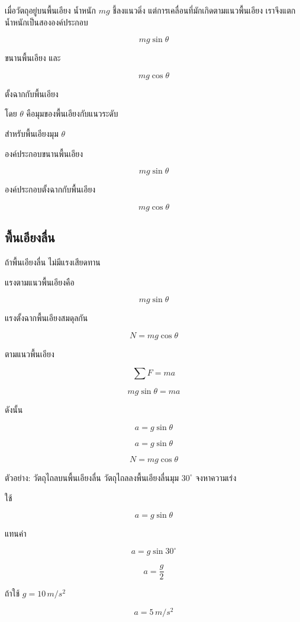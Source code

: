 เมื่อวัตถุอยู่บนพื้นเอียง น้ำหนัก $mg$ ชี้ลงแนวดิ่ง แต่การเคลื่อนที่มักเกิดตามแนวพื้นเอียง เราจึงแตกน้ำหนักเป็นสององค์ประกอบ

\[
mg\sin\theta
\]

ขนานพื้นเอียง และ

\[
mg\cos\theta
\]

ตั้งฉากกับพื้นเอียง

โดย $\theta$ คือมุมของพื้นเอียงกับแนวระดับ

\begin{tcolorbox}[title=องค์ประกอบของน้ำหนักบนพื้นเอียง]
สำหรับพื้นเอียงมุม $\theta$

องค์ประกอบขนานพื้นเอียง

\[
mg\sin\theta
\]

องค์ประกอบตั้งฉากกับพื้นเอียง

\[
mg\cos\theta
\]
\end{tcolorbox}

\subsection{พื้นเอียงลื่น}

ถ้าพื้นเอียงลื่น ไม่มีแรงเสียดทาน

แรงตามแนวพื้นเอียงคือ

\[
mg\sin\theta
\]

แรงตั้งฉากพื้นเอียงสมดุลกัน

\[
N=mg\cos\theta
\]

ตามแนวพื้นเอียง

\[
\sum F=ma
\]

\[
mg\sin\theta=ma
\]

ดังนั้น

\[
a=g\sin\theta
\]

\begin{tcolorbox}[title=พื้นเอียงลื่น]
\[
a=g\sin\theta
\]

\[
N=mg\cos\theta
\]
\end{tcolorbox}

\begin{examplebox}{ตัวอย่าง: วัตถุไถลบนพื้นเอียงลื่น}
วัตถุไถลลงพื้นเอียงลื่นมุม $30^\circ$ จงหาความเร่ง

ใช้

\[
a=g\sin\theta
\]

แทนค่า

\[
a=g\sin30^\circ
\]

\[
a=\frac{g}{2}
\]

ถ้าใช้ $g=10\,\si{m/s^2}$

\[
\boxed{a=5\,\si{m/s^2}}
\]
\end{examplebox}

